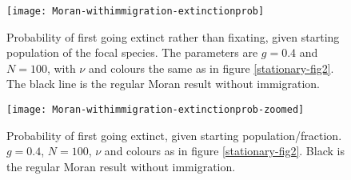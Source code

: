 \begin{figure}[ht]
	\centering
	\texttt{[image: Moran-withimmigration-extinctionprob]}
	\caption{Probability of first going extinct rather than fixating, given starting population of the focal species. The parameters are $g=0.4$ and $N=100$, with $\nu$ and colours the same as in figure \ref{stationary-fig2}. The black line is the regular Moran result without immigration. } \label{extnprobfig}
\end{figure}
\begin{figure}[ht]
	\centering
	\texttt{[image: Moran-withimmigration-extinctionprob-zoomed]}
	\caption{Probability of first going extinct, given starting population/fraction. $g=0.4$, $N=100$, $\nu$ and colours as in figure \ref{stationary-fig2}. Black is the regular Moran result without immigration. }
\end{figure}
\fi

